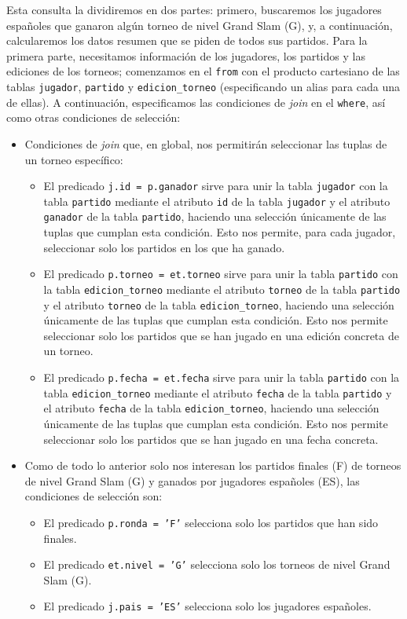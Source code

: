 \documentclass[11pt]{opticajnl}
\begin{document}
Esta consulta la dividiremos en dos partes: primero, buscaremos los jugadores españoles que ganaron algún torneo de nivel Grand Slam (G), y, a continuación, calcularemos los datos resumen que se piden de todos sus partidos. Para la primera parte, necesitamos información de los jugadores, los partidos y las ediciones de los torneos; comenzamos en el \texttt{from} con el producto cartesiano de las tablas \texttt{jugador}, \texttt{partido} y \texttt{edicion\_torneo} (especificando un alias para cada una de ellas). A continuación, especificamos las condiciones de \textit{join} en el \texttt{where}, así como otras condiciones de selección:
\begin{itemize}
\item Condiciones de \textit{join} que, en global, nos permitirán seleccionar las tuplas de un torneo específico:
\begin{itemize}
\item El predicado \texttt{j.id = p.ganador} sirve para unir la tabla \texttt{jugador} con la tabla \texttt{partido} mediante el atributo \texttt{id} de la tabla \texttt{jugador} y el atributo \texttt{ganador} de la tabla \texttt{partido}, haciendo una selección únicamente de las tuplas que cumplan esta condición. Esto nos permite, para cada jugador, seleccionar solo los partidos en los que ha ganado. 
\item El predicado \texttt{p.torneo = et.torneo} sirve para unir la tabla \texttt{partido} con la tabla \texttt{edicion\_torneo} mediante el atributo \texttt{torneo} de la tabla \texttt{partido} y el atributo \texttt{torneo} de la tabla \texttt{edicion\_torneo}, haciendo una selección únicamente de las tuplas que cumplan esta condición. Esto nos permite seleccionar solo los partidos que se han jugado en una edición concreta de un torneo.
\item El predicado \texttt{p.fecha = et.fecha} sirve para unir la tabla \texttt{partido} con la tabla \texttt{edicion\_torneo} mediante el atributo \texttt{fecha} de la tabla \texttt{partido} y el atributo \texttt{fecha} de la tabla \texttt{edicion\_torneo}, haciendo una selección únicamente de las tuplas que cumplan esta condición. Esto nos permite seleccionar solo los partidos que se han jugado en una fecha concreta.
\end{itemize}
\item Como de todo lo anterior solo nos interesan los partidos finales (F) de torneos de nivel Grand Slam (G) y ganados por jugadores españoles (ES), las condiciones de selección son:
\begin{itemize}
\item El predicado \texttt{p.ronda = 'F'} selecciona solo los partidos que han sido finales.
\item El predicado \texttt{et.nivel = 'G'} selecciona solo los torneos de nivel Grand Slam (G).
\item El predicado \texttt{j.pais = 'ES'} selecciona solo los jugadores españoles.
\end{itemize}
\end{itemize}
\end{document}
